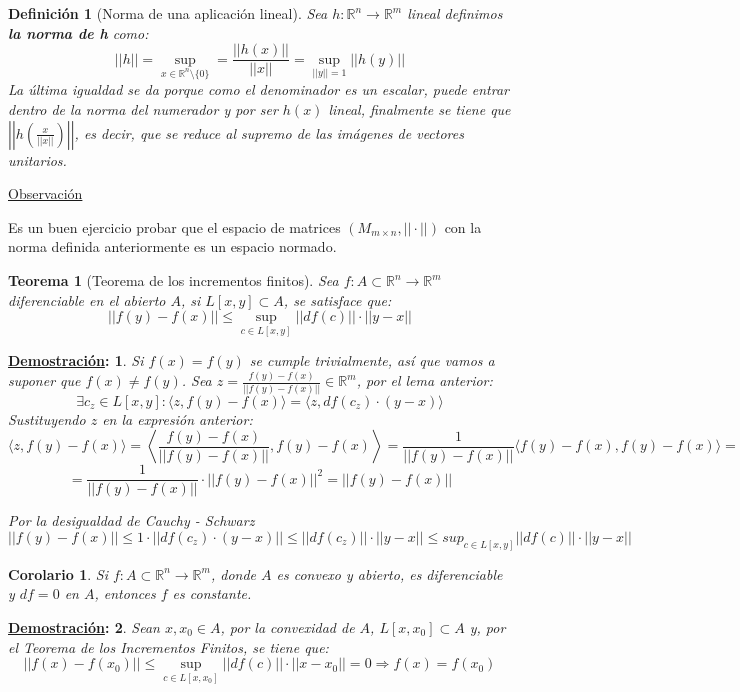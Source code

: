 \documentclass[10pt,a4paper,openright]{book}
\theoremstyle{break}
\newtheorem*{defi}{Definición}
\newtheorem*{theo}{Teorema}
\newtheorem*{coro}{Corolario}
\newtheorem*{demo}{\underline{Demostración}:}
\begin{document}
\begin{defi}[Norma de una aplicación lineal]
Sea $h: \mathbb{R}^n \to \mathbb{R}^m$ lineal definimos \textbf{la norma de h} como:
$$||h|| = \sup_{x \in \mathbb{R}^n \setminus \{0\}} = \frac{||h(x)||}{||x||} = \sup_{||y|| = 1} || h(y)|| $$
La última igualdad se da porque como el denominador es un escalar, puede entrar dentro de la norma del numerador y por ser $h(x)$ lineal, finalmente se tiene que $\left|\left|h\left(\frac{x}{||x||}\right)\right|\right|$, es decir, que se reduce al supremo de las imágenes de vectores unitarios.
\end{defi}

\underline{Observación}

Es un buen ejercicio probar que el espacio de matrices $(M_{m \times n}, || \cdot || ) $ con la norma definida anteriormente es un espacio normado.

\begin{theo}[Teorema de los incrementos finitos]
Sea $f: A \subset \mathbb{R}^n \to \mathbb{R}^m$ diferenciable en el abierto $A$, si $L[x,y] \subset A$, se satisface que:
$$|| f(y) - f(x) || \leq \sup _{c \in L[x,y]} || df(c) || \cdot || y - x||$$
\end{theo}

\begin{demo}
Si  $f(x) = f(y)$ se cumple trivialmente, así que vamos a suponer que $f(x) \neq f(y)$. Sea $z = \frac{f(y) - f(x)}{|| f(y) - f(x) ||} \in \mathbb{R}^m$, por el lema anterior:
$$\exists c_z \in L[x,y] :  \langle z, f(y) - f(x)\rangle = \langle z, df(c_z) \cdot (y-x) \rangle$$
Sustituyendo $z$ en la expresión anterior:
$$\langle z, f(y) - f(x)\rangle = \left\langle \frac{f(y) - f(x)}{|| f(y) - f(x) ||}, f(y) - f(x)\right\rangle = \frac{1}{|| f(y) - f(x) ||} \langle f(y) - f(x), f(y) - f(x) \rangle =$$
$$=\frac{1}{|| f(y) - f(x) ||} \cdot || f(y) - f(x) ||^2 = || f(y) - f(x) ||$$

Por la desigualdad de Cauchy - Schwarz 
$$|| f(y) - f(x) || \leq 1 \cdot || df(c_z) \cdot (y-x) || \leq || df(c_z) || \cdot ||y-x|| \leq sup_{c \in L[x,y]} || df(c)|| \cdot || y - x|| $$
\end{demo}

\begin{coro}
Si $f: A \subset \mathbb{R}^n \to \mathbb{R}^m$, donde $A$ es convexo y abierto, es diferenciable y $df = 0$ en $A$, entonces $f$ es constante.
\end{coro}
\begin{demo}
Sean $x,x_0 \in A$, por la convexidad de $A$, $L[x,x_0] \subset A$ y, por el Teorema de los Incrementos Finitos, se tiene que:
$$|| f(x) - f(x_0) || \leq \sup_{c \in L[x,x_0]} || d f(c) || \cdot || x - x_0 || = 0 \Rightarrow f(x) = f(x_0)$$
\end{demo}
\end{document}
